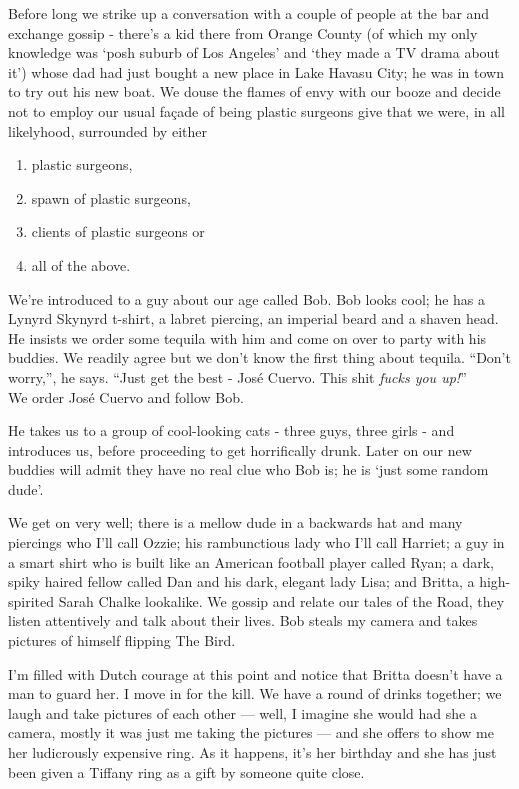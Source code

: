 \documentclass[a5paper,titlepage,11pt]{book}
\begin{document}
Before long we strike up a conversation with a couple of people at the bar and exchange gossip - there's a kid there from Orange County (of which my only knowledge was `posh suburb of Los Angeles' and `they made a TV drama about it') whose dad had just bought a new place in Lake Havasu City; he was in town to try out his new boat.  We douse the flames of envy with our booze and decide not to employ our usual fa\c{c}ade of being plastic surgeons give that we were, in all likelyhood, surrounded by either
\begin{enumerate}
\item plastic surgeons,
\item spawn of plastic surgeons,
\item clients of plastic surgeons or
\item all of the above.
\end{enumerate}

We're introduced to a guy about our age called Bob.  Bob looks cool; he has a Lynyrd Skynyrd t-shirt, a labret piercing, an imperial beard and a shaven head.  He insists we order some tequila with him and come on over to party with his buddies.  We readily agree but we don't know the first thing about tequila.  ``Don't worry,'', he says.  ``Just get the best - Jos\'{e} Cuervo.  This shit \emph{fucks you up!}'' \\
We order Jos\'{e} Cuervo and follow Bob.

He takes us to a group of cool-looking cats - three guys, three girls - and introduces us, before proceeding to get horrifically drunk.  Later on our new buddies will admit they have no real clue who Bob is; he is `just some random dude'.

We get on very well; there is a mellow dude in a backwards hat and many piercings who I'll call Ozzie; his rambunctious lady who I'll call Harriet; a guy in a smart shirt who is built like an American football player called Ryan; a dark, spiky haired fellow called Dan and his dark, elegant lady Lisa; and Britta, a high-spirited Sarah Chalke lookalike.  We gossip and relate our tales of the Road, they listen attentively and talk about their lives.  Bob steals my camera and takes pictures of himself flipping The Bird.

I'm filled with Dutch courage at this point and notice that Britta doesn't have a man to guard her.  I move in for the kill.  We have a round of drinks together; we laugh and take pictures of each other --- well, I imagine she would had she a camera, mostly it was just me taking the pictures --- and she offers to show me her ludicrously expensive ring.  As it happens, it's her birthday and she has just been given a Tiffany ring as a gift by someone quite close.
\end{document}
